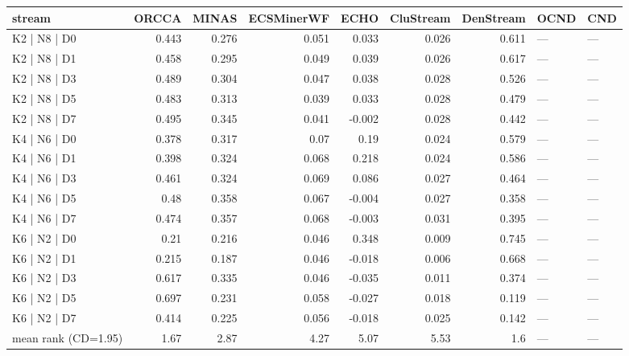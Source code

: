 \begin{tabular}{lrrrrrrll}
\hline
 stream              &   ORCCA &   MINAS &   ECSMinerWF &   ECHO &   CluStream &   DenStream & OCND   & CND   \\
\hline
 K2 | N8 | D0        &   0.443 &   0.276 &        0.051 &  0.033 &       0.026 &       0.611 & ---    & ---   \\
 K2 | N8 | D1        &   0.458 &   0.295 &        0.049 &  0.039 &       0.026 &       0.617 & ---    & ---   \\
 K2 | N8 | D3        &   0.489 &   0.304 &        0.047 &  0.038 &       0.028 &       0.526 & ---    & ---   \\
 K2 | N8 | D5        &   0.483 &   0.313 &        0.039 &  0.033 &       0.028 &       0.479 & ---    & ---   \\
 K2 | N8 | D7        &   0.495 &   0.345 &        0.041 & -0.002 &       0.028 &       0.442 & ---    & ---   \\
 K4 | N6 | D0        &   0.378 &   0.317 &        0.07  &  0.19  &       0.024 &       0.579 & ---    & ---   \\
 K4 | N6 | D1        &   0.398 &   0.324 &        0.068 &  0.218 &       0.024 &       0.586 & ---    & ---   \\
 K4 | N6 | D3        &   0.461 &   0.324 &        0.069 &  0.086 &       0.027 &       0.464 & ---    & ---   \\
 K4 | N6 | D5        &   0.48  &   0.358 &        0.067 & -0.004 &       0.027 &       0.358 & ---    & ---   \\
 K4 | N6 | D7        &   0.474 &   0.357 &        0.068 & -0.003 &       0.031 &       0.395 & ---    & ---   \\
 K6 | N2 | D0        &   0.21  &   0.216 &        0.046 &  0.348 &       0.009 &       0.745 & ---    & ---   \\
 K6 | N2 | D1        &   0.215 &   0.187 &        0.046 & -0.018 &       0.006 &       0.668 & ---    & ---   \\
 K6 | N2 | D3        &   0.617 &   0.335 &        0.046 & -0.035 &       0.011 &       0.374 & ---    & ---   \\
 K6 | N2 | D5        &   0.697 &   0.231 &        0.058 & -0.027 &       0.018 &       0.119 & ---    & ---   \\
 K6 | N2 | D7        &   0.414 &   0.225 &        0.056 & -0.018 &       0.025 &       0.142 & ---    & ---   \\
 mean rank (CD=1.95) &   1.67  &   2.87  &        4.27  &  5.07  &       5.53  &       1.6   & ---    & ---   \\
\hline
\end{tabular}